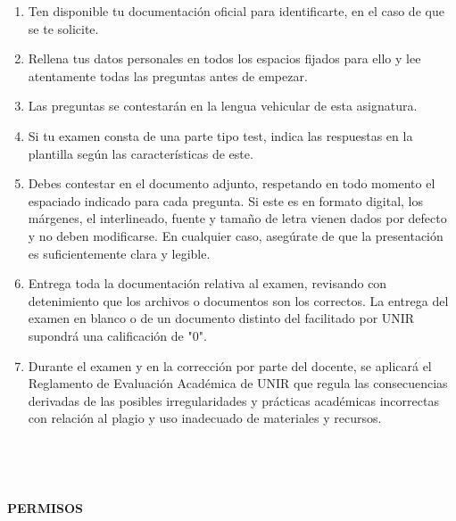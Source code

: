 \documentclass[12pt,a4paper,twoside]{article}
\renewcommand{\arraystretch}{1.5} %
\newlength{\espacioRestanteMain}
\newcommand{\freespaceBox}{
	
	\setlength{\espacioRestanteMain}{\dimexpr\textheight-\pagetotal-\baselineskip-15pt\relax}
	
	\ifthenelse{\lengthtest{\espacioRestanteMain > 3cm}}{
		\noindent
		\colorbox{gray!10}{
		  \begin{minipage}[t][\espacioRestanteMain][c]{0.98\textwidth}
			\begin{center}
			  \fontsize{14}{21}\selectfont
			  \textcolor{gray!80}
			  {
			  NO UTILIZAR ESTA PARTE DE LA HOJA.\\
			  CONTINÚA A PARTIR DE LA SIGUIENTE\\
			  PÁGINA.
			  }
			\end{center}
		  \end{minipage}
		}
	}{}
}
\begin{document}
\noindent\begin{minipage}{0.97\textwidth}
	\fontsize{12}{18}\selectfont
	\begin{enumerate}[label=.]\item Ten disponible tu documentación oficial para identificarte, en el caso de que se te solicite.\item Rellena tus datos personales en todos los espacios fijados para ello y lee atentamente todas las preguntas antes de empezar.\item Las preguntas se contestarán en la lengua vehicular de esta asignatura.\item Si tu examen consta de una parte tipo test, indica las respuestas en la plantilla según las características de este.\item Debes contestar en el documento adjunto, respetando en todo momento el espaciado indicado para cada pregunta. Si este es en formato digital, los márgenes, el interlineado, fuente y tamaño de letra vienen dados por defecto y no deben modificarse. En cualquier caso, asegúrate de que la presentación es suficientemente clara y legible.\item Entrega toda la documentación relativa al examen, revisando con detenimiento que los archivos o documentos son los correctos. La entrega del examen en blanco o de un documento distinto del facilitado por UNIR supondrá una calificación de "0".\item Durante el examen y en la corrección por parte del docente, se aplicará el Reglamento de Evaluación Académica de UNIR que regula las consecuencias derivadas de las posibles irregularidades y prácticas académicas incorrectas con relación al plagio y uso inadecuado de materiales y recursos.\end{enumerate}\
\end{minipage}
\\

\freespaceBox



\newpage
\begin{tcolorbox}[colback=white, colframe={customBlue}, width=\textwidth, left=5pt, right=0pt, boxrule=0.5pt, rounded corners, boxsep=3pt]
	\fontsize{14}{21}\selectfont\bfseries 
PERMISOS
\end{tcolorbox}

\vspace{10pt}


	\renewcommand{\arraystretch}{1.5} %
    
\end{document}
